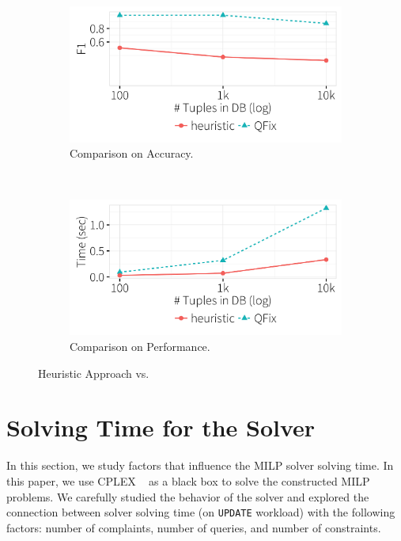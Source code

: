   \begin{figure}[hbt]
  \centering
    \begin{subfigure} [t]{.33\textwidth}
    \includegraphics[width = .99\columnwidth]{figures/heuristicacc}
    \vspace*{-.25in}
    \caption{Comparison on Accuracy. }
    \label{f:heuristic_acc} 
    \end{subfigure}\\
    \begin{subfigure} [t]{.33\textwidth}
    \includegraphics[width = .99\columnwidth]{figures/heuristictime}
    \vspace*{-.25in}
    \caption{Comparison on Performance. }
    \vspace*{-.1in}
    \label{f:heuristic_time} 
    \end{subfigure}
   \caption{Heuristic Approach vs. \sys}
   \vspace*{-.1in}
  \end{figure}

\section{Solving Time for the Solver}
\label{app:solvtime}
In this section, we study factors that influence the MILP solver solving time. In this paper, we
use CPLEX ~\cite{cplex2014v12} as a black box to solve the constructed MILP problems. 
We carefully studied 
the behavior of the solver and explored the connection between solver solving time (on \texttt{UPDATE} workload) with the following factors:
number of complaints, number of queries, and number of constraints. 
 
